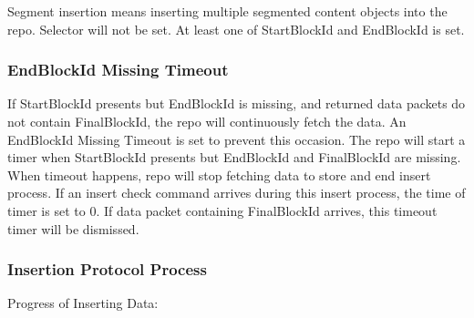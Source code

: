 \documentclass{acm_proc_article-sp}
\begin{document}
Segment insertion means inserting multiple segmented content objects into the repo. Selector will not be set. At least one of StartBlockId and EndBlockId is set.

\subsubsection{EndBlockId Missing Timeout}
If StartBlockId presents but EndBlockId is missing, and returned data packets do not contain FinalBlockId, the repo will continuously fetch the data. An EndBlockId Missing Timeout is set to prevent this occasion. The repo will start a timer when StartBlockId presents but EndBlockId and FinalBlockId are missing. When timeout happens, repo will stop fetching data to store and end insert process. If an insert check command arrives during this insert process, the time of timer is set to 0. If data packet containing FinalBlockId arrives, this timeout timer will be dismissed.

\subsubsection{Insertion Protocol Process}

Progress of Inserting Data:
\end{document}
